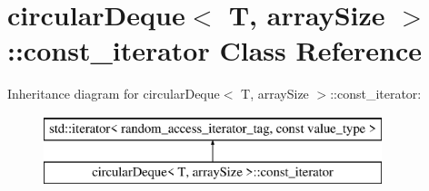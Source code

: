 \hypertarget{classcircularDeque_1_1const__iterator}{\section{circular\+Deque$<$ T, array\+Size $>$\+:\+:const\+\_\+iterator Class Reference}
\label{classcircularDeque_1_1const__iterator}
}
Inheritance diagram for circular\+Deque$<$ T, array\+Size $>$\+:\+:const\+\_\+iterator\+:\begin{figure}[H]
\begin{center}
\leavevmode
\includegraphics[height=2.000000cm]{classcircularDeque_1_1const__iterator}
\end{center}
\end{figure}
